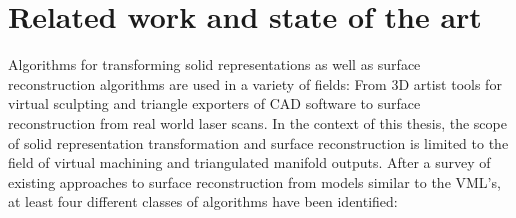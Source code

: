 
\chapter{Related work and state of the art}
\label{ch:state_of_the_art}

Algorithms for transforming solid representations as well as surface reconstruction algorithms are used in a variety of fields:
From 3D artist tools for virtual sculpting and triangle exporters of CAD software to surface reconstruction from real world laser scans.
In the context of this thesis, the scope of solid representation transformation and surface reconstruction is limited to the field of virtual machining and triangulated manifold outputs.
After a survey of existing approaches to surface reconstruction from models similar to the VML's, at least four different classes of algorithms have been identified:

